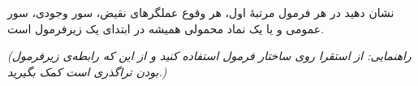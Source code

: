 نشان دهید در هر فرمول مرتبه‌ٔ اول، هر وقوع عملگرهای نقیض، سور وجودی، سور عمومی و یا یک نماد محمولی  همیشه در ابتدای یک زیرفرمول است.

\emph{(راهنمایی: از استقرا روی ساختار فرمول استفاده کنید و از این که رابطه‌ی زیرفرمول بودن تراگذری است کمک بگیرید.)}